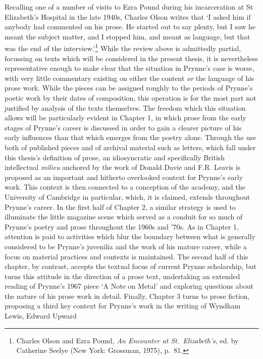 \documentclass[]{article}
\begin{document}
Recalling one of a number of visits to Ezra Pound during his
incarceration at St Elizabeth's Hospital in the late 1940s, Charles
Olson writes that `I asked him if anybody had commented on his prose. He
started out to say plenty, but I saw he meant the subject matter, and I
stopped him, and meant as language, but that was the end of the
interview.'\footnote{Charles Olson and Ezra Pound, \emph{An Encounter at
  St.~Elizabeth's}, ed. by Catherine Seelye (New York: Grossman, 1975),
  p.~81.} While the review above is admittedly partial, focussing on
texts which will be considered in the present thesis, it is nevertheless
representative enough to make clear that the situation in Prynne's case
is worse, with very little commentary existing on either the content
\emph{or} the language of his prose work. While the pieces can be
assigned roughly to the periods of Prynne's poetic work by their dates
of composition, this operation is for the most part not justified by
analysis of the texts themselves. The freedom which this situation
allows will be particularly evident in Chapter 1, in which prose from
the early stages of Prynne's career is discussed in order to gain a
clearer picture of his early influences than that which emerges from the
poetry alone. Through the use both of published pieces and of archival
material such as letters, which fall under this thesis's definition of
prose, an idiosyncratic and specifically British intellectual
\emph{milieu} anchored by the work of Donald Davie and F.R. Leavis is
proposed as an important and hitherto overlooked context for Prynne's
early work. This context is then connected to a conception of the
academy, and the University of Cambridge in particular, which, it is
claimed, extends throughout Prynne's career. In the first half of
Chapter 2, a similar strategy is used to illuminate the little magazine
scene which served as a conduit for so much of Prynne's poetry and prose
throughout the 1960s and '70s. As in Chapter 1, attention is paid to
activities which blur the boundary between what is generally considered
to be Prynne's juvenilia and the work of his mature career, while a
focus on material practices and contexts is maintained. The second half
of this chapter, by contrast, accepts the textual focus of current
Prynne scholarship, but turns this attitude in the direction of a prose
text, undertaking an extended reading of Prynne's 1967 piece `A Note on
Metal' and exploring questions about the nature of his prose work in
detail. Finally, Chapter 3 turns to prose fiction, proposing a third key
context for Prynne's work in the writing of Wyndham Lewis, Edward Upward
\end{document}
